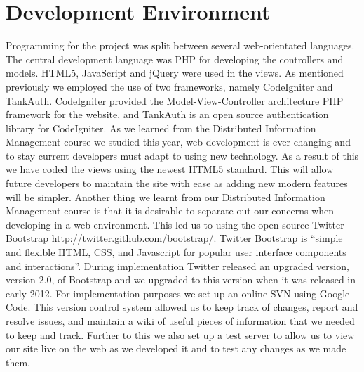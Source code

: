 \documentclass{l3proj}
\begin{document}
\label{chap:ui}
\section{Development Environment}
Programming for the project was split between several web-orientated languages. The central development language was PHP for developing the controllers and models. HTML5, JavaScript and jQuery were used in the views. As mentioned previously we employed the use of two frameworks, namely CodeIgniter and TankAuth. CodeIgniter provided the Model-View-Controller architecture PHP framework for the website, and TankAuth is an open source authentication library for CodeIgniter.\newline
\newline
As we learned from the Distributed Information Management course we studied this year, web-development is ever-changing and to stay current developers must adapt to using new technology. As a result of this we have coded the views using the newest HTML5 standard. This will allow future developers to maintain the site with ease as adding new modern features will be simpler.\newline
\newline
Another thing we learnt from our Distributed Information Management course is that it is desirable to separate out our concerns when developing in a web environment. This led us to using the open source Twitter Bootstrap \url{http://twitter.github.com/bootstrap/}. Twitter Bootstrap is “simple and flexible HTML, CSS, and Javascript for popular user interface components and interactions”. During implementation Twitter released an upgraded version, version 2.0, of Bootstrap and we upgraded to this version when it was released in early 2012.\newline
\newline
For implementation purposes we set up an online SVN using Google Code. This version control system allowed us to keep track of changes, report and resolve issues, and maintain a wiki of useful pieces of information that we needed to keep and track.\newline
\newline
Further to this we also set up a test server to allow us to view our site live on the web as we developed it and to test any changes as we made them.\newline
\newline
\end{document}
